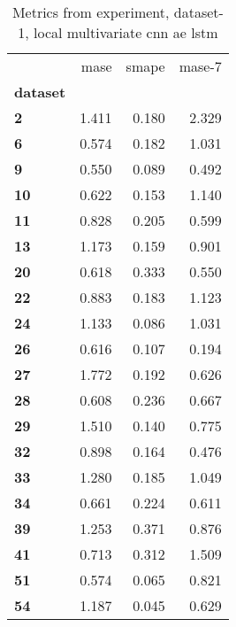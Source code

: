 \begin{table}[h]
\centering
\caption{Metrics from experiment, dataset-1, local multivariate cnn ae lstm}
\label{table:local-multivariate-cnn-ae-lstm-dataset-1}
\begin{tabular}{lrrr}
\toprule
{} &   mase &  smape &  mase-7 \\
\textbf{dataset} &        &        &         \\
\midrule
\textbf{2      } &  1.411 &  0.180 &   2.329 \\
\textbf{6      } &  0.574 &  0.182 &   1.031 \\
\textbf{9      } &  0.550 &  0.089 &   0.492 \\
\textbf{10     } &  0.622 &  0.153 &   1.140 \\
\textbf{11     } &  0.828 &  0.205 &   0.599 \\
\textbf{13     } &  1.173 &  0.159 &   0.901 \\
\textbf{20     } &  0.618 &  0.333 &   0.550 \\
\textbf{22     } &  0.883 &  0.183 &   1.123 \\
\textbf{24     } &  1.133 &  0.086 &   1.031 \\
\textbf{26     } &  0.616 &  0.107 &   0.194 \\
\textbf{27     } &  1.772 &  0.192 &   0.626 \\
\textbf{28     } &  0.608 &  0.236 &   0.667 \\
\textbf{29     } &  1.510 &  0.140 &   0.775 \\
\textbf{32     } &  0.898 &  0.164 &   0.476 \\
\textbf{33     } &  1.280 &  0.185 &   1.049 \\
\textbf{34     } &  0.661 &  0.224 &   0.611 \\
\textbf{39     } &  1.253 &  0.371 &   0.876 \\
\textbf{41     } &  0.713 &  0.312 &   1.509 \\
\textbf{51     } &  0.574 &  0.065 &   0.821 \\
\textbf{54     } &  1.187 &  0.045 &   0.629 \\
\bottomrule
\end{tabular}
\end{table}
